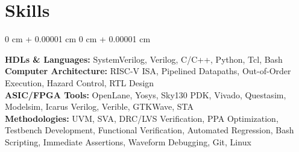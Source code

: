 \documentclass[10pt, letterpaper]{article}
\newenvironment{onecolentry}{
    \begin{adjustwidth}{
        0 cm + 0.00001 cm
    }{
        0 cm + 0.00001 cm
    }
}{
    \end{adjustwidth}
}
\begin{document}
    \section{Skills}
        \begin{onecolentry}
            \textbf{HDLs \& Languages:} SystemVerilog, Verilog, C/C++, Python, Tcl, Bash \\
            \textbf{Computer Architecture:} RISC-V ISA, Pipelined Datapaths, Out-of-Order Execution, Hazard Control, RTL Design \\
            \textbf{ASIC/FPGA Tools:} OpenLane, Yosys, Sky130 PDK, Vivado, Questasim, Modelsim, Icarus Verilog, Verible, GTKWave, STA \\
            \textbf{Methodologies:} UVM, SVA, DRC/LVS Verification, PPA Optimization, Testbench Development, Functional Verification, Automated Regression, Bash Scripting, Immediate Assertions, Waveform Debugging, Git, Linux
        \end{onecolentry}
\end{document}
